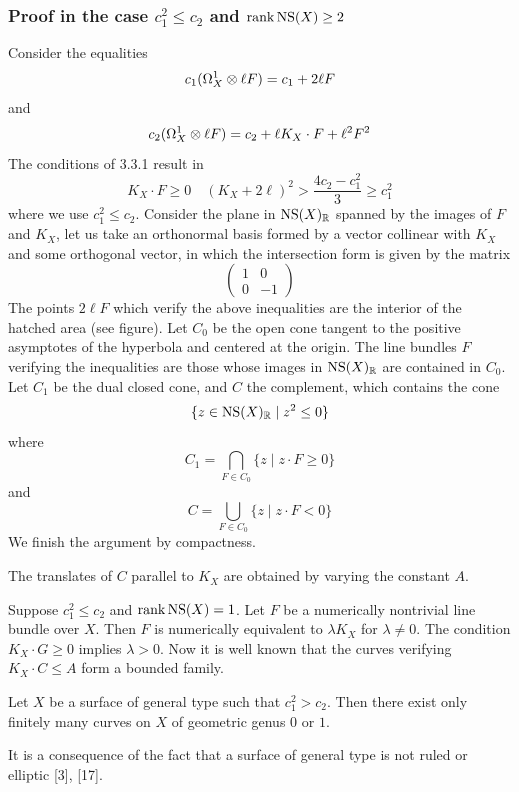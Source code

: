 \documentclass[main.tex]{subfiles}
\begin{document}
\subsubsection{Proof in the case $c_1^2 \le c_2$ and $\operatorname{\mathrm{rank}} \operatorname{\mathrm{NS}}(X) \ge 2$}

Consider the equalities
\[ c_1(\Omega_X^1 \otimes \ell F) = c_1 + 2 \ell F \]
and
\[ c_2(\Omega_X^1 \otimes \ell F) = c_2 + \ell K_X \cdot F + \ell^2 F^2 \]
The conditions of 3.3.1 result in
\[ K_X \cdot F \ge 0 \quad (K_X + 2 \ell )^2 > \frac{4 c_2 - c_1^2}{3} \ge c_1^2 \]
where we use $c_1^2 \le c_2$. Consider the plane in $\operatorname{\mathrm{NS}}(X)_{\mathbb{R}}$ spanned by the images of $F$ and $K_X$, let us take an orthonormal basis formed by a vector collinear with $K_X$ and some orthogonal vector, in which the intersection form is given by the matrix
\[ \begin{pmatrix}
1 & 0
\\
0 & -1
\end{pmatrix} \]
The points $2 \ell F$ which verify the above inequalities are the interior of the hatched area (see figure). Let $C_0$ be the open cone tangent to the positive asymptotes of the hyperbola and centered at the origin. The line bundles $F$ verifying the inequalities are those whose images in $\operatorname{\mathrm{NS}}(X)_{\mathbb{R}}$ are contained in $C_0$. Let $C_1$ be the dual closed cone, and $C$ the complement, which contains the cone
\[ \{ z \in \operatorname{\mathrm{NS}}(X)_{\mathbb{R}} \mid z^2 \le 0 \} \]
where
\[ C_1 = \bigcap_{F \in C_0} \{ z \mid z \cdot F \ge 0 \} \]
and
\[ C = \bigcup_{F \in C_0} \{ z \mid z \cdot F < 0 \} \]
We finish the argument by compactness.
\par
The translates of $C$ parallel to $K_X$ are obtained by varying the constant $A$.

\begin{rmk}
Suppose $c_1^2 \le c_2$ and $\operatorname{\mathrm{rank}}{\operatorname{\mathrm{NS}}(X)} = 1$. Let $F$ be a numerically nontrivial line bundle over $X$. Then $F$ is numerically equivalent to $\lambda K_X$ for $\lambda \neq 0$. The condition $K_X \cdot G \ge 0$ implies $\lambda > 0$. Now it is well known that the curves verifying $K_X \cdot C \le A$ form a bounded family.
\end{rmk}

\begin{cor}
Let $X$ be a surface of general type such that $c_1^2 > c_2$. Then there exist only finitely many curves on $X$ of geometric genus $0$ or $1$.
\end{cor}

It is a consequence of the fact that a surface of general type is not ruled or elliptic [3], [17].
\end{document}
